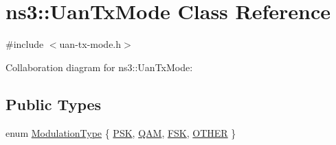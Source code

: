 \hypertarget{classns3_1_1UanTxMode}{}\section{ns3\+:\+:Uan\+Tx\+Mode Class Reference}
\label{classns3_1_1UanTxMode}


{\ttfamily \#include $<$uan-\/tx-\/mode.\+h$>$}



Collaboration diagram for ns3\+:\+:Uan\+Tx\+Mode\+:
\subsection*{Public Types}
\begin{DoxyCompactItemize}
\item 
enum \hyperlink{classns3_1_1UanTxMode_a0e822d222c13aa9499c96d9b3ad21223}{Modulation\+Type} \{ \hyperlink{classns3_1_1UanTxMode_a0e822d222c13aa9499c96d9b3ad21223a7156882ae618d1885dc6b3af26de4477}{P\+SK}, 
\hyperlink{classns3_1_1UanTxMode_a0e822d222c13aa9499c96d9b3ad21223a46eb4484c33656f6929c00afd038b299}{Q\+AM}, 
\hyperlink{classns3_1_1UanTxMode_a0e822d222c13aa9499c96d9b3ad21223aed210294b6a9642f3f027ccb74cdf7b6}{F\+SK}, 
\hyperlink{classns3_1_1UanTxMode_a0e822d222c13aa9499c96d9b3ad21223a5358ed9e093870402823f95c2cda1110}{O\+T\+H\+ER}
 \}
\end{DoxyCompactItemize}
